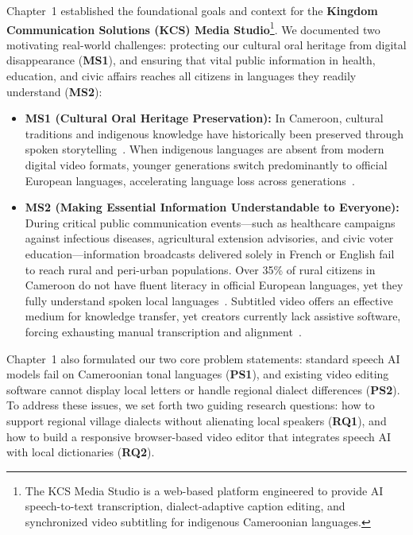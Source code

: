 \documentclass[a4paper,11pt]{article}
\begin{document}
Chapter~1 established the foundational goals and context for the \textbf{Kingdom Communication Solutions (KCS) Media Studio}\footnote{The KCS Media Studio is a web-based platform engineered to provide AI speech-to-text transcription, dialect-adaptive caption editing, and synchronized video subtitling for indigenous Cameroonian languages.}. We documented two motivating real-world challenges: protecting our cultural oral heritage from digital disappearance (\textbf{MS1}), and ensuring that vital public information in health, education, and civic affairs reaches all citizens in languages they readily understand (\textbf{MS2}):
\begin{itemize}
    \item \textbf{MS1 (Cultural Oral Heritage Preservation):} In Cameroon, cultural traditions and indigenous knowledge have historically been preserved through spoken storytelling~\cite{grenoble2010language}. When indigenous languages are absent from modern digital video formats, younger generations switch predominantly to official European languages, accelerating language loss across generations~\cite{adelani2022masakhaner}.
    \item \textbf{MS2 (Making Essential Information Understandable to Everyone):} During critical public communication events---such as healthcare campaigns against infectious diseases, agricultural extension advisories, and civic voter education---information broadcasts delivered solely in French or English fail to reach rural and peri-urban populations. Over 35\% of rural citizens in Cameroon do not have fluent literacy in official European languages, yet they fully understand spoken local languages~\cite{mayer2020multimedia, bigioi2023multilingual}. Subtitled video offers an effective medium for knowledge transfer, yet creators currently lack assistive software, forcing exhausting manual transcription and alignment~\cite{won2025endtoend}.
\end{itemize}

Chapter~1 also formulated our two core problem statements: standard speech AI models fail on Cameroonian tonal languages (\textbf{PS1}), and existing video editing software cannot display local letters or handle regional dialect differences (\textbf{PS2}). To address these issues, we set forth two guiding research questions: how to support regional village dialects without alienating local speakers (\textbf{RQ1}), and how to build a responsive browser-based video editor that integrates speech AI with local dictionaries (\textbf{RQ2}).
\end{document}
